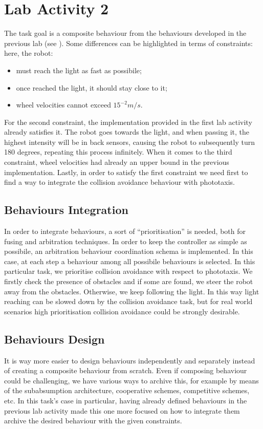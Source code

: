 \section{Lab Activity 2}
The task goal is a composite behaviour from the behaviours developed in the
previous lab (see ). Some differences can be highlighted in
terms of constraints: here, the robot:
\begin{itemize}
    \item must reach the light as fast as possibile;
    \item once reached the light, it should stay close to it;
    \item wheel velocities cannot exceed $15^{-2}m/s$.
\end{itemize}
For the second constraint, the implementation provided in the first lab
activity already satisfies it. The robot goes towards the light, and when
passing it, the highest intensity will be in back sensors, causing the robot to
subsequently turn 180 degrees, repeating this process infinitely. When it comes
to the third constraint, wheel velocities had already an upper bound in the
previous implementation. Lastly, in order to satisfy the first constraint we
need first to find a way to integrate the collision avoidance behaviour with
phototaxis.

\subsection{Behaviours Integration} In order to integrate behaviours, a sort of
``prioritisation'' is needed, both for fusing and arbitration techniques. In
order to keep the controller as simple as possibile, an arbitration behaviour
coordination schema is implemented. In this case, at each step a behaviour
among all possibile behaviours is selected. In this particular task, we
prioritise collision avoidance with respect to phototaxis. We firstly check the
presence of obstacles and if some are found, we steer the robot away from the
obstacles. Otherwise, we keep following the light. In this way light reaching
can be slowed down by the collision avoidance task, but for real world
scenarios high prioritisation collision avoidance could be strongly desirable.

\subsection{Behaviours Design} It is way more easier to design behaviours
independently and separately instead of creating a composite behaviour from
scratch. Even if composing behaviour could be challenging, we have various ways
to archive this, for example by means of the subabsumption architecture,
cooperative schemes, competitive schemes, etc. In this task's case in
particular, having already defined behaviours in the previous lab activity made
this one more focused on how to integrate them archive the desired behaviour
with the given constraints.

